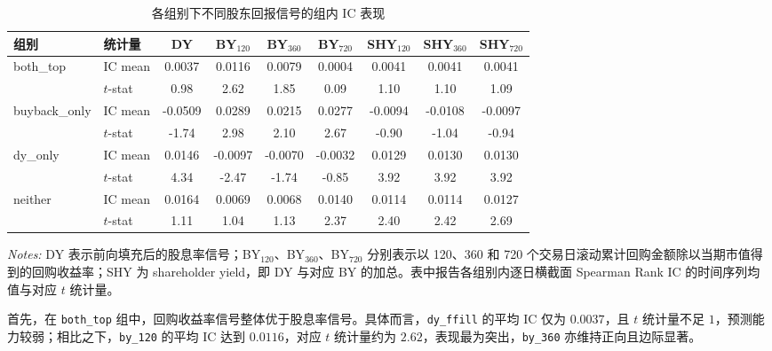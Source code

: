 \documentclass[a4paper,10pt]{article}
\begin{document}
\begin{table}[H]
\centering
\caption{各组别下不同股东回报信号的组内 IC 表现}
\label{tab:group_ic_results}
\small
\begin{tabular}{llccccccc}
\toprule
组别 & 统计量 & DY & BY$_{120}$ & BY$_{360}$ & BY$_{720}$ & SHY$_{120}$ & SHY$_{360}$ & SHY$_{720}$ \\
\midrule

\multirow{2}{*}{both\_top}
& IC mean & 0.0037 & 0.0116 & 0.0079 & 0.0004 & 0.0041 & 0.0041 & 0.0041 \\
& $t$-stat & 0.98 & 2.62 & 1.85 & 0.09 & 1.10 & 1.10 & 1.09 \\

\midrule

\multirow{2}{*}{buyback\_only}
& IC mean & -0.0509 & 0.0289 & 0.0215 & 0.0277 & -0.0094 & -0.0108 & -0.0097 \\
& $t$-stat & -1.74 & 2.98 & 2.10 & 2.67 & -0.90 & -1.04 & -0.94 \\

\midrule

\multirow{2}{*}{dy\_only}
& IC mean & 0.0146 & -0.0097 & -0.0070 & -0.0032 & 0.0129 & 0.0130 & 0.0130 \\
& $t$-stat & 4.34 & -2.47 & -1.74 & -0.85 & 3.92 & 3.92 & 3.92 \\

\midrule

\multirow{2}{*}{neither}
& IC mean & 0.0164 & 0.0069 & 0.0068 & 0.0140 & 0.0114 & 0.0114 & 0.0127 \\
& $t$-stat & 1.11 & 1.04 & 1.13 & 2.37 & 2.40 & 2.42 & 2.69 \\

\bottomrule
\end{tabular}
\vspace{0.5em}
\begin{minipage}{0.92\textwidth}
\footnotesize
\textit{Notes:} DY 表示前向填充后的股息率信号；BY$_{120}$、BY$_{360}$、BY$_{720}$ 分别表示以 120、360 和 720 个交易日滚动累计回购金额除以当期市值得到的回购收益率；SHY 为 shareholder yield，即 DY 与对应 BY 的加总。表中报告各组别内逐日横截面 Spearman Rank IC 的时间序列均值与对应 $t$ 统计量。
\end{minipage}
\end{table}




首先，在 \texttt{both\_top} 组中，回购收益率信号整体优于股息率信号。具体而言，\texttt{dy\_ffill} 的平均 IC 仅为 $0.0037$，且 $t$ 统计量不足 $1$，预测能力较弱；相比之下，\texttt{by\_120} 的平均 IC 达到 $0.0116$，对应 $t$ 统计量约为 $2.62$，表现最为突出，\texttt{by\_360} 亦维持正向且边际显著。
\end{document}
